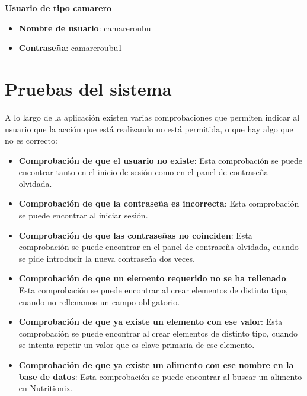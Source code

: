 \textbf{Usuario de tipo camarero}
\begin{itemize}
	\item \textbf{Nombre de usuario}: camareroubu
	\item \textbf{Contraseña}: camareroubu1	
\end{itemize}


\section{Pruebas del sistema}

A lo largo de la aplicación existen varias comprobaciones que permiten indicar al usuario que la acción que está realizando no está permitida, o que hay algo que no es correcto:

\begin{itemize}
	\item \textbf{Comprobación de que el usuario no existe}: Esta comprobación se puede encontrar tanto en el inicio de sesión como en el panel de contraseña olvidada.


\item \textbf{Comprobación de que la contraseña es incorrecta}: Esta comprobación se puede encontrar al iniciar sesión.

	
	\item \textbf{Comprobación de que las contraseñas no coinciden}: Esta comprobación se puede encontrar en el panel de contraseña olvidada, cuando se pide introducir la nueva contraseña dos veces.
	

\item \textbf{Comprobación de que un elemento requerido no se ha rellenado}: Esta comprobación se puede encontrar al crear elementos de distinto tipo, cuando no rellenamos un campo obligatorio.
	

\item \textbf{Comprobación de que ya existe un elemento con ese valor}: Esta comprobación se puede encontrar al crear elementos de distinto tipo, cuando se intenta repetir un valor que es clave primaria de ese elemento.
	

\item \textbf{Comprobación de que ya existe un alimento con ese nombre en la base de datos}: Esta comprobación se puede encontrar al buscar un alimento en Nutritionix.	
	
\end{itemize}

